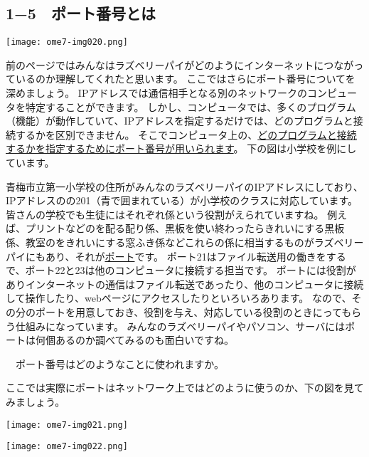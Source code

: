 \clearpage\subsection*{1−5　ポート番号とは}
\label{P:port}

\centering
\texttt{[image: ome7-img020.png]}
\flushleft

前のページではみんなはラズベリーパイがどのようにインターネットにつながっているのか理解してくれたと思います。
ここではさらにポート番号についてを深めましょう。
IPアドレスでは通信相手となる別のネットワークのコンピュータを特定することができます。
しかし、コンピュータでは、多くのプログラム（機能）が動作していて、IPアドレスを指定するだけでは、どのプログラムと接続するかを区別できません。
そこでコンピュータ上の、\underline{どのプログラムと接続するかを指定するためにポート番号が用いられます}。
下の図は小学校を例にしています。

青梅市立第一小学校の住所がみんなのラズベリーパイのIPアドレスにしており、IPアドレスのの201（青で囲まれている）が小学校のクラスに対応しています。
皆さんの学校でも生徒にはそれぞれ係という役割がえられていますね。
例えば、プリントなどのを配る配り係、黒板を使い終わったらきれいにする黒板係、教室のをきれいにする窓ふき係などこれらの係に相当するものがラズベリーパイにもあり、それが\underline{ポート}です。
ポート21はファイル転送用の働きをするで、ポート22と23は他のコンピュータに接続する担当です。
ポートには役割がありインターネットの通信はファイル転送であったり、他のコンピュータに接続して操作したり、webページにアクセスしたりといろいろあります。
なので、その分のポートを用意しておき、役割を与え、対応している役割のときにってもらう仕組みになっています。
みんなのラズベリーパイやパソコン、サーバにはポートは何個あるのか調べてみるのも面白いですね。

\clearpage
{}\theQuestion　ポート番号はどのようなことに使われますか。\label{Q:portUsage}


ここでは実際にポートはネットワーク上ではどのように使うのか、下の図を見てみましょう。

\centering
\texttt{[image: ome7-img021.png]}

\centering
\texttt{[image: ome7-img022.png]}
\flushleft


